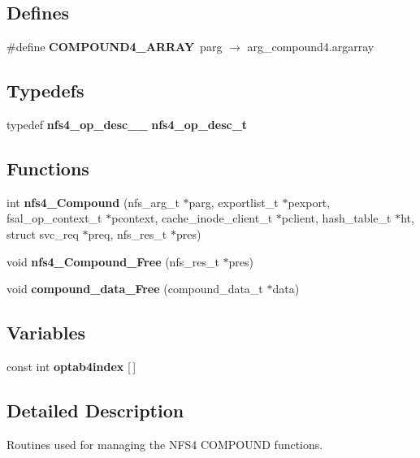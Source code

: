 \subsection*{Defines}
\begin{CompactItemize}
\item 
\#define {\bf COMPOUND4\_\-ARRAY}\ parg $\rightarrow$ arg\_\-compound4.argarray
\end{CompactItemize}
\subsection*{Typedefs}
\begin{CompactItemize}
\item 
typedef {\bf nfs4\_\-op\_\-desc\_\-\_\-} {\bf nfs4\_\-op\_\-desc\_\-t}
\end{CompactItemize}
\subsection*{Functions}
\begin{CompactItemize}
\item 
int {\bf nfs4\_\-Compound} (nfs\_\-arg\_\-t $\ast$parg, exportlist\_\-t $\ast$pexport, fsal\_\-op\_\-context\_\-t $\ast$pcontext, cache\_\-inode\_\-client\_\-t $\ast$pclient, hash\_\-table\_\-t $\ast$ht, struct svc\_\-req $\ast$preq, nfs\_\-res\_\-t $\ast$pres)
\item 
void {\bf nfs4\_\-Compound\_\-Free} (nfs\_\-res\_\-t $\ast$pres)
\item 
void {\bf compound\_\-data\_\-Free} (compound\_\-data\_\-t $\ast$data)
\end{CompactItemize}
\subsection*{Variables}
\begin{CompactItemize}
\item 
const int {\bf optab4index} [$\,$]
\end{CompactItemize}


\subsection{Detailed Description}
Routines used for managing the NFS4 COMPOUND functions. 

